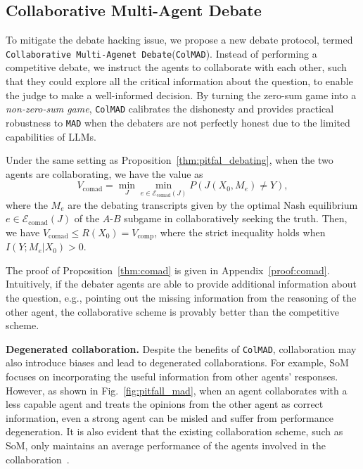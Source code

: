 \documentclass{article} %
\newcommand{\oursfull}[0]{\texttt{Collaborative Multi-Agenet Debate}\xspace}
\newcommand{\ours}[0]{\texttt{ColMAD}\xspace}
\newcommand{\mad}[0]{\texttt{MAD}\xspace}
\begin{document}
\subsection{Collaborative Multi-Agent Debate}
\label{sec:comad_method}
To mitigate the debate hacking issue, we propose a new debate protocol, termed \oursfull (\ours). Instead of performing a competitive debate, we instruct the agents to collaborate with each other, such that they could explore all the critical information about the question, to enable the judge to make a well-informed decision. 
By turning the zero-sum game into a \textit{non-zero-sum game}, \ours calibrates the dishonesty and provides practical robustness to \mad when the debaters are not perfectly honest due to the limited capabilities of LLMs.
\begin{proposition}\label{thm:comad}
    Under the same setting as Proposition~\ref{thm:pitfal_debating}, when the two agents are collaborating, we have the value as
    \[
    V_\mathrm{comad}=\min_J\min_{e\in\mathcal{E}_\mathrm{comad}(J)}P(J(X_0,M_e)\neq Y),
    \]
    where the $M_e$ are the debating transcripts given by the optimal Nash equilibrium $e\in\mathcal{E}_\mathrm{comad}(J)$ of the $A$-$B$ subgame in collaboratively seeking the truth. Then, we have $V_\mathrm{comad}\leq R(X_0)=V_\textrm{comp}$, where the strict inequality holds when $I(Y;M_e|X_0)>0$.
\end{proposition}
The proof of Proposition~\ref{thm:comad} is given in Appendix~\ref{proof:comad}.
Intuitively, if the debater agents are able to provide additional information about the question, e.g., pointing out the missing information from the reasoning of the other agent, the collaborative scheme is provably better than the competitive scheme.

\textbf{Degenerated collaboration.} Despite the benefits of \ours, collaboration may also introduce biases and lead to degenerated collaborations. For example, SoM~\citep{du2023improving} focuses on incorporating the useful information from other agents' responses. However, as shown in Fig.~\ref{fig:pitfall_mad}, when an agent collaborates with a less capable agent and treats the opinions from the other agent as correct information, even a strong agent can be misled and suffer from performance degeneration. It is also evident that the existing collaboration scheme, such as SoM, only maintains an average performance of the agents involved in the collaboration~\citep{Yang2025RevisitingMD,Zhang2025IfMD}. 
\end{document}
